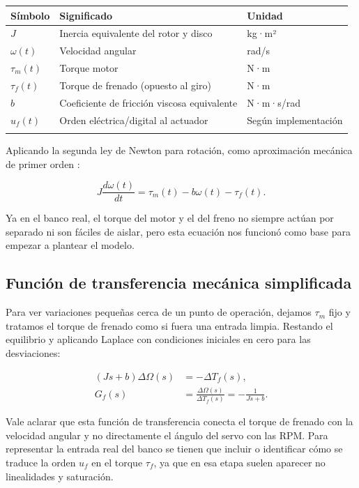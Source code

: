 \documentclass[9pt,a4paper,twocolumn]{extarticle}
\renewcommand{\arraystretch}{1.08}
\begin{document}
\begin{center}\begingroup\setlength{\tabcolsep}{2pt}\renewcommand{\arraystretch}{1.15}\scriptsize
\begin{tabularx}{\columnwidth}{@{}YYY@{}}
\toprule
\textbf{Símbolo} & \textbf{Significado} & \textbf{Unidad}\\
\midrule
$J$ & Inercia equivalente del rotor y disco & kg·m²\\
\addlinespace[2pt]
$\omega(t)$ & Velocidad angular & rad/s\\
\addlinespace[2pt]
$\tau_m(t)$ & Torque motor & N·m\\
\addlinespace[2pt]
$\tau_f(t)$ & Torque de frenado (opuesto al giro) & N·m\\
\addlinespace[2pt]
$b$ & Coeficiente de fricción viscosa equivalente & N·m·s/rad\\
\addlinespace[2pt]
$u_f(t)$ & Orden eléctrica/digital al actuador & Según implementación\\
\addlinespace[2pt]
\bottomrule
\end{tabularx}\endgroup\end{center}

Aplicando la segunda ley de Newton para rotación, como aproximación mecánica de primer orden \cite{ogata2010}:

\[
J\frac{d\omega(t)}{dt}=\tau_m(t)-b\omega(t)-\tau_f(t).
\tag{1}
\]

Ya en el banco real, el torque del motor y el del freno no siempre actúan por separado ni son fáciles de aislar, pero esta ecuación nos funcionó como base para empezar a plantear el modelo.

\subsection{Función de transferencia mecánica
simplificada}
Para ver variaciones pequeñas cerca de un punto de operación, dejamos $\tau_m$ fijo y tratamos el torque de frenado como si fuera una entrada limpia. Restando el equilibrio y aplicando Laplace con condiciones iniciales en cero para las desviaciones:

\begin{equation}
\begin{aligned}
(Js+b)\Delta\Omega(s)&=-\Delta T_f(s),\\
G_f(s)&=\frac{\Delta\Omega(s)}{\Delta T_f(s)}
=-\frac{1}{Js+b}.
\end{aligned}
\end{equation}

Vale aclarar que esta función de transferencia conecta el torque de frenado con la velocidad angular y no directamente el ángulo del servo con las RPM. Para representar la entrada real del banco se tienen que incluir o identificar cómo se traduce la orden $u_f$ en el torque $\tau_f$, ya que en esa etapa suelen aparecer no linealidades y saturación.
\end{document}
